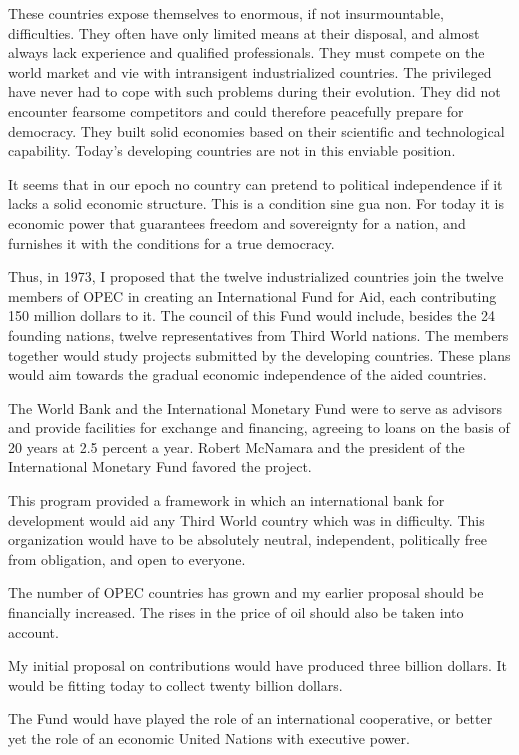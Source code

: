 These countries expose themselves to enormous, if not insurmountable, difficulties. They often have only limited means at their disposal, and almost always lack experience and qualified professionals. They must compete on the world market and vie with intransigent industrialized countries. The privileged have never had to cope with such problems during their evolution. They did not encounter fearsome competitors and could therefore peacefully prepare for democracy. They built solid economies based on their scientific and technological capability. Today's developing countries are not in this enviable position. 

It seems that in our epoch no country can pretend to political independence if it lacks a solid economic structure. This is a condition sine gua non. For today it is economic power that guarantees freedom and sovereignty for a nation, and furnishes it with the conditions for a true democracy. 

Thus, in 1973, I proposed that the twelve industrialized countries join the twelve members of OPEC in creating an International Fund for Aid, each contributing 150 million dollars to it. The council of this Fund would include, besides the 24 founding nations, twelve representatives from Third World nations. The members together would study projects submitted by the developing countries. These plans would aim towards the gradual economic independence of the aided countries. 

The World Bank and the International Monetary Fund were to serve as advisors and provide facilities for exchange and financing, agreeing to loans on the basis of 20 years at 2.5 percent a year. Robert McNamara and the president of the International Monetary Fund favored the project. 

This program provided a framework in which an international bank for development would aid any Third World country which was in difficulty. This organization would have to be absolutely neutral, independent, politically free from obligation, and open to everyone. 

The number of OPEC countries has grown and my earlier proposal should be financially increased. The rises in the price of oil should also be taken into account. 

My initial proposal on contributions would have produced three billion dollars. It would be fitting today to collect twenty billion dollars. 

The Fund would have played the role of an international cooperative, or better yet the role of an economic United Nations with executive power. 

